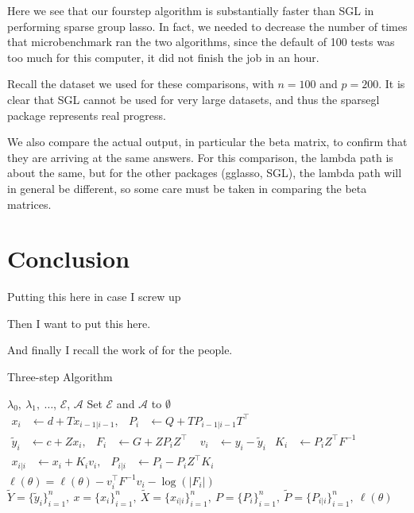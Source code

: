 \documentclass[12pt]{article}
\begin{document}
Here we see that our fourstep algorithm is substantially faster than SGL in performing sparse group lasso. In fact, we needed to decrease the number of times that microbenchmark ran the two algorithms, since the default of 100 tests was too much for this computer, it did not finish the job in an hour.

Recall the dataset we used for these comparisons, with $n=100$ and $p=200$. It is clear that SGL cannot be used for very large datasets, and thus the sparsegl package represents real progress.


We also compare the actual output, in particular the beta matrix, to confirm that they are arriving at the same answers. For this comparison, the lambda path is about the same, but for the other packages (gglasso, SGL), the lambda path will in general be different, so some care must be taken in comparing the beta matrices.

\section{Conclusion}


Putting this here in case I screw up \citep{tibshirani2012strong}

Then I want to put this \citep{yang2015fast} here.

And finally I recall the work of \citep{simon2013sparse} for the people.

\begin{algorithm}
  \caption{Three-step Algorithm\label{alg:kalman}}
  \begin{algorithmic}
     $\lambda_0,\ \lambda_1,\ \dots$, $\mathcal{E}$, $\mathcal{A}$
    \STATE Set $\mathcal{E}$ and $\mathcal{A}$ to $\emptyset$ 
    \STATE $\begin{aligned} x_{i}
      &\leftarrow d + T x_{i-1|i-1}, & P_i &\leftarrow Q + T P_{i-1|i-1}
      T^\top\end{aligned}$ 
    \STATE $\begin{aligned}\widetilde{y}_i
      &\leftarrow c + Z  x_i, & F_i &\leftarrow G + Z P_i
      Z^\top\end{aligned}$ 
    \STATE $\begin{aligned}v_i&\leftarrow y_i-\widetilde{y}_i& K_i&
      \leftarrow P_i Z^\top F^{-1}\end{aligned}$ 
    \STATE $\begin{aligned} x_{i|i}
      &\leftarrow  x_i + K_i v_i, & P_{i|i} &\leftarrow P_i - P_iZ^\top
      K_i\end{aligned}$ 
    \STATE $\ell(\theta) = \ell(\theta) -v_i^\top F^{-1}v_i - \log(|F_i|)$
    \ENDFOR
    \RETURN $\widetilde{Y}=\{\widetilde{y}_i\}_{i=1}^n,\  x=\{ x_i\}_{i=1}^n,\
    \widetilde{X}=\{x_{i|i}\}_{i=1}^n,\ P=\{P_i\}_{i=1}^n,\
    \widetilde{P}=\{P_{i|i}\}_{i=1}^n,\ \ell(\theta)$
  \end{algorithmic}
\end{algorithm}



\end{document}
